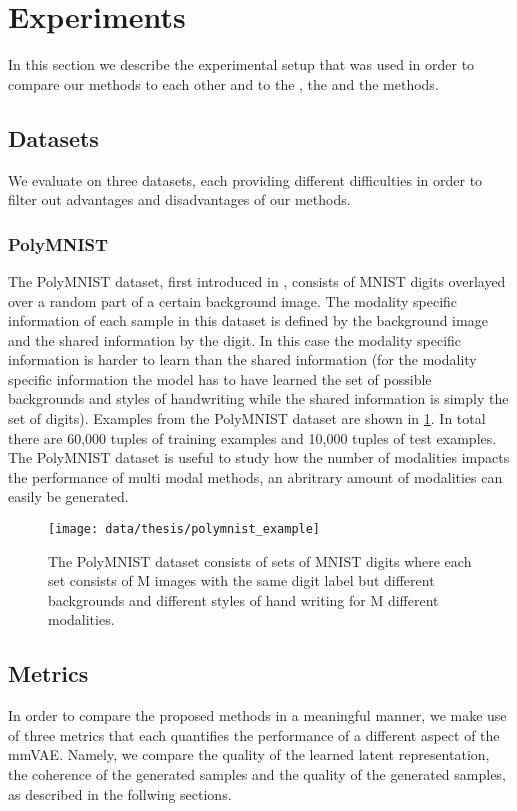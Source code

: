 \section{Experiments}
In this section we describe the experimental setup that was used in order to compare our methods to each other and to the , the  and the  methods.

\subsection{Datasets}
We evaluate on three datasets, each providing different difficulties in order to filter out advantages and disadvantages of our methods.

\subsubsection{PolyMNIST} \label{polymnist}
The PolyMNIST dataset, first introduced in \cite{sutter_multimodal_2020}, consists of MNIST digits overlayed over a random part of a certain background image.
The modality specific information of each sample in this dataset is defined by the background image and the shared information by the digit.
In this case the modality specific information is harder to learn than the shared information (for the modality specific information the model has to have learned the set of possible backgrounds and styles of handwriting while the shared information is simply the set of digits).
Examples from the PolyMNIST dataset are shown in \cref{fig:PolyMNIST}.
In total there are 60,000 tuples of training examples and 10,000 tuples of test examples.
The PolyMNIST dataset is useful to study how the number of modalities impacts the performance of multi modal methods, an abritrary amount of modalities can easily be generated.

\begin{figure}[h!]
    \centering
    \texttt{[image: data/thesis/polymnist\_example]}
    \caption{The PolyMNIST dataset consists of sets of MNIST
    digits where each set consists of M images
    with the same digit label but different backgrounds
    and different styles of hand writing for M different modalities.}
    \label{fig:PolyMNIST}
\end{figure}

\subsection{Metrics}
In order to compare the proposed methods in a meaningful manner, we make use of three metrics that each quantifies the performance of a different aspect of the mmVAE.
Namely, we compare the quality of the learned latent representation, the coherence of the generated samples and the quality of the generated samples, as described in the follwing sections.

